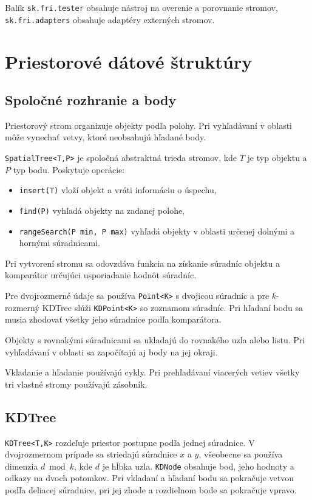 \documentclass[12pt,a4paper,oneside]{report}
\begin{document}
Balík \texttt{sk.fri.tester} obsahuje nástroj na overenie a porovnanie
stromov, \texttt{sk.fri.adapters} obsahuje adaptéry externých stromov.

\chapter{Priestorové dátové štruktúry}
\label{chap:structures}

\section{Spoločné rozhranie a body}
Priestorový strom organizuje objekty podľa polohy. Pri vyhľadávaní
v oblasti môže vynechať vetvy, ktoré neobsahujú hľadané body.

\texttt{SpatialTree<T,P>} je spoločná abstraktná trieda stromov,
kde \(T\) je typ objektu a \(P\) typ bodu. Poskytuje operácie:
\begin{itemize}[leftmargin=1.5em]
\item \texttt{insert(T)} vloží objekt a vráti informáciu o úspechu,
\item \texttt{find(P)} vyhľadá objekty na zadanej polohe,
\item \texttt{rangeSearch(P min, P max)} vyhľadá objekty v oblasti
  určenej dolnými a hornými súradnicami.
\end{itemize}
Pri vytvorení stromu sa odovzdáva funkcia na získanie súradníc objektu
a komparátor určujúci usporiadanie hodnôt súradníc.

Pre dvojrozmerné údaje sa používa \texttt{Point<K>} s dvojicou
súradníc a pre \(k\)-rozmerný KDTree slúži \texttt{KDPoint<K>} so
zoznamom súradníc. Pri hľadaní bodu sa musia zhodovať všetky jeho
súradnice podľa komparátora.

Objekty s rovnakými súradnicami sa ukladajú do rovnakého uzla alebo listu.
Pri vyhľadávaní v oblasti sa započítajú aj body na jej okraji.

Vkladanie a hľadanie používajú cykly. Pri prehľadávaní viacerých vetiev
všetky tri vlastné stromy používajú zásobník.

\section{KDTree}
\texttt{KDTree<T,K>} rozdeľuje priestor postupne podľa jednej súradnice.
V dvojrozmernom prípade sa striedajú súradnice \(x\) a \(y\), všeobecne
sa používa dimenzia \(d \bmod k\), kde \(d\) je hĺbka uzla.
\texttt{KDNode} obsahuje bod, jeho hodnoty a odkazy na dvoch potomkov.
Pri vkladaní a hľadaní bodu sa pokračuje vetvou podľa deliacej súradnice,
pri jej zhode a rozdielnom bode sa pokračuje vpravo.
\end{document}
